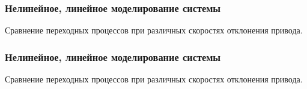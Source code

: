 \documentclass{beamer}
\begin{document}
\begin{frame}[t]
    \frametitle{Нелинейное, линейное моделирование системы}
\begin{center}
    Сравнение переходных процессов при различных скоростях отклонения привода. 
    \vspace{14pt}

        \begin{minipage}{0.49\textwidth}
            \begin{center}
            \resizebox{1.0\textwidth}{!}{}
            \end{center}
        \end{minipage}
        \hfill
        \begin{minipage}{0.49\textwidth}
            \begin{center}
                \resizebox{1.0\textwidth}{!}{}
            \end{center}
        \end{minipage}
\end{center}
\end{frame}


\begin{frame}[t]
    \frametitle{Нелинейное, линейное моделирование системы}
\begin{center}
    Сравнение переходных процессов при различных скоростях отклонения привода. 
    \vspace{14pt}

    \begin{minipage}{0.49\textwidth}
        \begin{center}
            \resizebox{\textwidth}{!}{}
        \end{center}
    \end{minipage}
    \hfill
    \begin{minipage}{0.49\textwidth}
        \begin{center}
            \resizebox{\textwidth}{!}{}
        \end{center}
    \end{minipage}
\end{center}
\end{frame}
\end{document}
